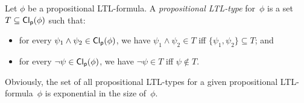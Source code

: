 \begin{definition}
    Let $\phi$ be a propositional LTL-formula.  A \emph{propositional LTL-type}
    for~$\phi$ is a set $T\subseteq\operatorname{\mathsf{Cl_p}}(\phi)$ such that:
    \begin{itemize}
        \item for every $\psi_1\land\psi_2\in\operatorname{\mathsf{Cl_p}}(\phi)$, we have
            $\psi_1\land\psi_2\in T$ iff $\{\psi_1,\psi_2\}\subseteq T$; and
        \item for every $\lnot\psi\in\operatorname{\mathsf{Cl_p}}(\phi)$, we have $\lnot\psi\in T$ iff
            $\psi\notin T$.
    \end{itemize}
\end{definition}

\noindent
Obviously, the set of all propositional LTL-types for a given propositional
LTL-formula~$\phi$ is exponential in the size of~$\phi$.

